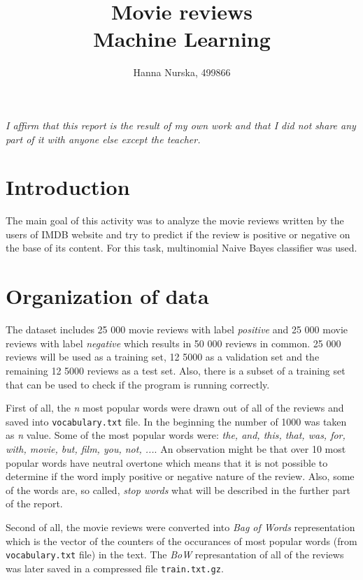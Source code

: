 \documentclass{article}
\title{Movie reviews \\ \large Machine Learning}
\author{Hanna Nurska, 499866}
\begin{document}
\maketitle
\begin{center}
    \textit{I affirm that this report is the result of my own work and that I did not share any part of it with anyone else except the teacher.}
\end{center}

\newpage
\section{Introduction}
\label{intro}
The main goal of this activity was to analyze the movie reviews written by the users of IMDB website and try to predict if the review is positive or negative on the base of its content.
For this task, multinomial Naive Bayes classifier was used.

\section{Organization of data}
\label{dataset}
The dataset includes 25 000 movie reviews with label \textit{positive} and 25 000 movie reviews with label \textit{negative} which results in 50 000 reviews in common. 25 000 reviews will be used as a training set, 12 5000 as a validation set and the remaining 12 5000 reviews as a test set. Also, there is a subset of a training set that can be used to check if the program is running correctly.

First of all, the \textit{n} most popular words were drawn out of all of the reviews and saved into \texttt{vocabulary.txt} file. In the beginning the number of 1000 was taken as \textit{n} value. Some of the most popular words were: \textit{the, and, this, that, was, for, with, movie, but, film, you, not, ...}. An observation might be that over 10 most popular words have neutral overtone which means that it is not possible to determine if the word imply positive or negative nature of the review. Also, some of the words are, so called, \textit{stop words} what will be described in the further part of the report.

Second of all, the movie reviews were converted into \textit{Bag of Words} representation which is the vector of the counters of the occurances of most popular words (from \texttt{vocabulary.txt} file) in the text. The \textit{BoW} represantation of all of the reviews was later saved in a compressed file \texttt{train.txt.gz}.
\end{document}

